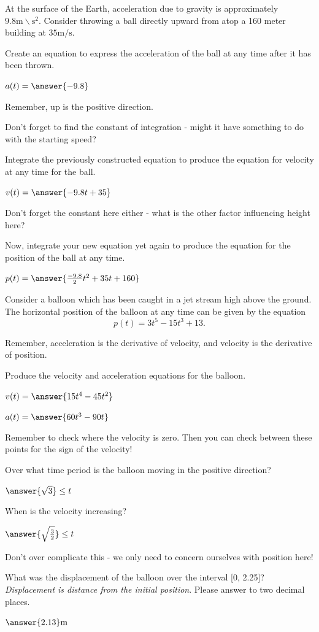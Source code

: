 \documentclass{ximera}
\begin{document}
\begin{question}
At the surface of the Earth, acceleration due to gravity is approximately $9.8 \text{m} \backslash \text{s}^2$. Consider throwing a ball directly upward from atop a 160 meter building at $35 \text{m} / \text{s}$.

Create an equation to express the acceleration of the ball at any time after it has been thrown.

$a(t) = \answer{-9.8}$
\begin{feedback}
Remember, up is the positive direction.
\end{feedback}

\begin{hint}
Don't forget to find the constant of integration - might it have something to do with the starting speed?
\end{hint}
Integrate the previously constructed equation to produce the equation for velocity at any time for the ball.

$v(t) = \answer{-9.8t+35}$

\begin{hint}
Don't forget the constant here either - what is the other factor influencing height here?
\end{hint}
Now, integrate your new equation yet again to produce the equation for the position of the ball at any time.

$p(t) = \answer{\frac{-9.8}{2}t^2+35t+160}$
\end{question}
\begin{question}
Consider a balloon which has been caught in a jet stream high above the ground. The horizontal position of the balloon at any time can be given by the equation $$p(t) = 3t^5-15t^3+13\text{.}$$

\begin{hint}
Remember, acceleration is the derivative of velocity, and velocity is the derivative of position.
\end{hint}
Produce the velocity and acceleration equations for the balloon.

$v(t) = \answer{15t^4-45t^2}$

$a(t) = \answer{60t^3-90t}$

\begin{hint}
Remember to check where the velocity is zero. Then you can check between these points for the sign of the velocity!
\end{hint}
Over what time period is the balloon moving in the positive direction?

$\answer{\sqrt{3}} \leq t$

When is the velocity increasing?

$\answer{\sqrt{\frac{3}{2}}} \leq t$

\begin{hint}
Don't over complicate this - we only need to concern ourselves with position here!
\end{hint}
What was the displacement of the balloon over the interval [0, 2.25]? \textit{Displacement is distance from the initial position}. Please answer to two decimal places.

$\answer{2.13} \text{m}$
\end{question}
\end{document}
